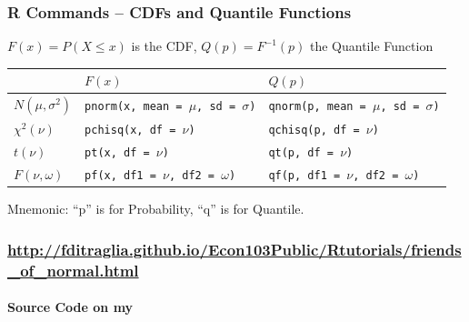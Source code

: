 \documentclass[handout]{beamer}
\begin{document}
\begin{frame}
\frametitle{R Commands -- CDFs and Quantile Functions}
$F(x) = P(X\leq x)$ is the CDF, $Q(p) = F^{-1}(p)$ the Quantile Function
\footnotesize
\begin{table}
\begin{tabular}{l|ll}
&$F(x)$&$Q(p)$\\
\hline
$N(\mu,\sigma^2)$ &\texttt{pnorm(x, mean = $\mu$,  sd = $\sigma$)}&\texttt{qnorm(p, mean = $\mu$,  sd = $\sigma$)}\\
$\chi^2(\nu)$&\texttt{pchisq(x, df = $\nu$)}&\texttt{qchisq(p, df = $\nu$)}\\
$t(\nu)$&\texttt{pt(x, df = $\nu$)}&\texttt{qt(p, df = $\nu$)}\\
$F(\nu,\omega)$&\texttt{pf(x, df1 = $\nu$, df2 = $\omega$)}&\texttt{qf(p, df1 = $\nu$, df2 = $\omega$)}
\end{tabular}
\end{table}
\vspace{1em}
\normalsize
\alert{Mnemonic: ``p'' is for Probability, ``q'' is for Quantile.}

\end{frame}
\begin{frame}
	\frametitle{\normalsize \href{http://fditraglia.github.io/Econ103Public/Rtutorials/friends_of_normal.html}{http://fditraglia.github.io/Econ103Public/Rtutorials/friends\_of\_normal.html}}
\framesubtitle{Source Code on my \href{https://github.com/fditraglia/Econ103Public/blob/master/Rtutorials/friends_of_normal.R}{}}



\begin{figure}
\end{figure}

\end{frame}
\end{document}

